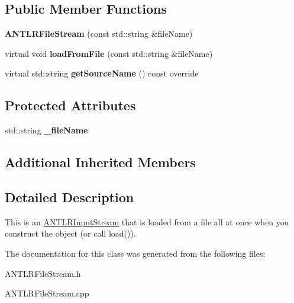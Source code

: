 \subsection*{Public Member Functions}
\begin{DoxyCompactItemize}
\item 
\mbox{\label{classantlr4_1_1ANTLRFileStream_ae73684208e79d7cb7d563bc3682a6245}} 
{\bfseries A\+N\+T\+L\+R\+File\+Stream} (const std\+::string \&file\+Name)
\item 
\mbox{\label{classantlr4_1_1ANTLRFileStream_ae8d8fcf45ba9498dcba5d4664fea76ad}} 
virtual void {\bfseries load\+From\+File} (const std\+::string \&file\+Name)
\item 
\mbox{\label{classantlr4_1_1ANTLRFileStream_a9c3954984c435d8e1a2a9bb898017486}} 
virtual std\+::string {\bfseries get\+Source\+Name} () const override
\end{DoxyCompactItemize}
\subsection*{Protected Attributes}
\begin{DoxyCompactItemize}
\item 
\mbox{\label{classantlr4_1_1ANTLRFileStream_a0b0c3fc70ad26d5bda57cbdfc503198e}} 
std\+::string {\bfseries \+\_\+file\+Name}
\end{DoxyCompactItemize}
\subsection*{Additional Inherited Members}


\subsection{Detailed Description}
This is an \hyperlink{classantlr4_1_1ANTLRInputStream}{A\+N\+T\+L\+R\+Input\+Stream} that is loaded from a file all at once when you construct the object (or call load()). 

The documentation for this class was generated from the following files\+:\begin{DoxyCompactItemize}
\item 
A\+N\+T\+L\+R\+File\+Stream.\+h\item 
A\+N\+T\+L\+R\+File\+Stream.\+cpp\end{DoxyCompactItemize}
